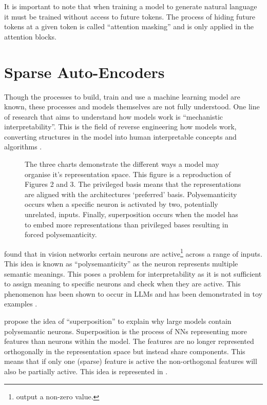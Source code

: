 It is important to note that when training a model to generate natural language it must be trained without access to future tokens.
The process of hiding future tokens at a given token is called ``attention masking'' and is only applied in the attention blocks.

\section{Sparse Auto-Encoders}
\label{sec:sae}

Though the processes to build, train and use a machine learning model are known, these processes and models themselves are not fully understood.
One line of research that aims to understand how models work is ``mechanistic interpretability''.
This is the field of reverse engineering how models work, converting structures in the model into human interpretable concepts and algorithms \citep{mech-interp}.

\begin{figure}
    \centering
    \captionsetup{width=.9\textwidth}
    
    \caption{The three charts demonstrate the different ways a model may organise it's representation space. This figure is a reproduction of \citet{superposition} Figures 2 and 3. The privileged basis means that the representations are aligned with the architectures `preferred' basis. Polysemanticity occurs when a specific neuron is activated by two, potentially unrelated, inputs. Finally, superposition occurs when the model has to embed more representations than privileged bases resulting in forced polysemanticity.}
    \label{fig:superposition}
\end{figure}

\citet{polysemanticity} found that in vision networks certain neurons are active\footnote{output a non-zero value.} across a range of inputs.
This idea is known as ``polysemanticity'' as the neuron represents multiple semantic meanings.
This poses a problem for interpretability as it is not sufficient to assign meaning to specific neurons and check when they are active.
This phenomenon has been shown to occur in LLMs and has been demonstrated in toy examples \citep{superposition}.

\citet{superposition} propose the idea of ``superposition'' to explain why large models contain polysemantic neurons.
Superposition is the process of NNs representing more features than neurons within the model.
The features are no longer represented orthogonally in the representation space but instead share components.
This means that if only one (sparse) feature is active the non-orthogonal features will also be partially active.
This idea is represented in .

